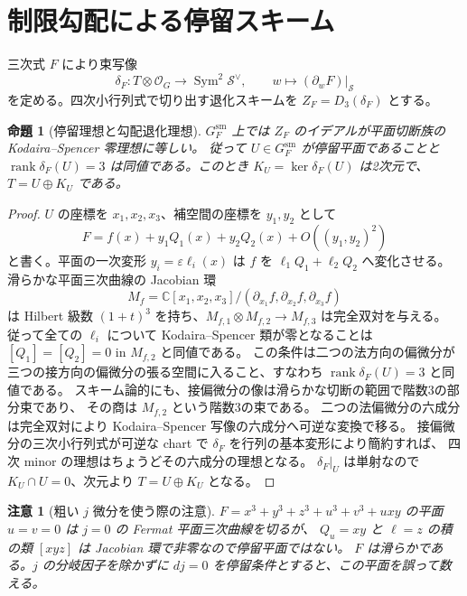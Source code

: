 \documentclass[11pt,a4paper]{ltjsarticle}
\newtheorem{proposition}[theorem]{命題}
\newtheorem{remark}[theorem]{注意}
\newcommand{\C}{\mathbb C}
\newcommand{\OO}{\mathcal O}
\newcommand{\Sym}{\operatorname{Sym}}
\newcommand{\rk}{\operatorname{rank}}
\newcommand{\cS}{\mathcal S}
\begin{document}
\section{制限勾配による停留スキーム}
三次式 $F$ により束写像
\begin{equation}\label{eq:delta}
 \delta_F:T\otimes\OO_G\longrightarrow\Sym^2\cS^\vee,
 \qquad w\longmapsto (\partial_wF)|_{\cS}
\end{equation}
を定める。四次小行列式で切り出す退化スキームを
$Z_F=D_3(\delta_F)$ とする。

\begin{proposition}[停留理想と勾配退化理想]\label{prop:KS}
$G_F^{\mathrm{sm}}$ 上では $Z_F$ のイデアルが平面切断族の Kodaira--Spencer 零理想に等しい。
従って $U\in G_F^{\mathrm{sm}}$ が停留平面であることと
$\rk\delta_F(U)=3$ は同値である。このとき
$K_U=\ker\delta_F(U)$ は2次元で、$T=U\oplus K_U$ である。
\end{proposition}
\begin{proof}
$U$ の座標を $x_1,x_2,x_3$、補空間の座標を $y_1,y_2$ として
\[
 F=f(x)+y_1Q_1(x)+y_2Q_2(x)+O((y_1,y_2)^2)
\]
と書く。平面の一次変形 $y_i=\varepsilon\ell_i(x)$ は
$f$ を $\ell_1Q_1+\ell_2Q_2$ へ変化させる。
滑らかな平面三次曲線の Jacobian 環
\[
 M_f=\C[x_1,x_2,x_3]/(\partial_{x_1}f,\partial_{x_2}f,\partial_{x_3}f)
\]
は Hilbert 級数 $(1+t)^3$ を持ち、$M_{f,1}\otimes M_{f,2}\to M_{f,3}$ は完全双対を与える。
従って全ての $\ell_i$ について Kodaira--Spencer 類が零となることは
$[Q_1]=[Q_2]=0$ in $M_{f,2}$ と同値である。
この条件は二つの法方向の偏微分が三つの接方向の偏微分の張る空間に入ること、すなわち
$\rk\delta_F(U)=3$ と同値である。
スキーム論的にも、接偏微分の像は滑らかな切断の範囲で階数3の部分束であり、
その商は $M_{f,2}$ という階数3の束である。
二つの法偏微分の六成分は完全双対により Kodaira--Spencer 写像の六成分へ可逆な変換で移る。
接偏微分の三次小行列式が可逆な chart で $\delta_F$ を行列の基本変形により簡約すれば、
四次 minor の理想はちょうどその六成分の理想となる。
$\delta_F|_U$ は単射なので $K_U\cap U=0$、次元より $T=U\oplus K_U$ となる。
\end{proof}

\begin{remark}[粗い $j$ 微分を使う際の注意]
$F=x^3+y^3+z^3+u^3+v^3+uxy$ の平面 $u=v=0$ は $j=0$ の Fermat 平面三次曲線を切るが、
$Q_u=xy$ と $\ell=z$ の積の類 $[xyz]$ は Jacobian 環で非零なので停留平面ではない。
$F$ は滑らかである。$j$ の分岐因子を除かずに $dj=0$ を停留条件とすると、この平面を誤って数える。
\end{remark}
\end{document}
